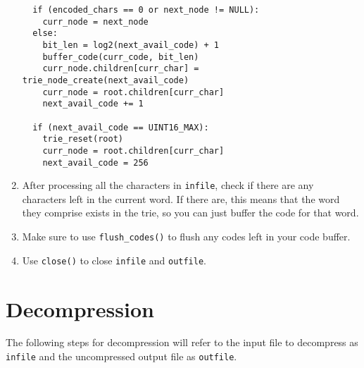 \documentclass{article}
\begin{document}
\begin{enumerate}
\begin{lstlisting}
  if (encoded_chars == 0 or next_node != NULL):
    curr_node = next_node
  else:
    bit_len = log2(next_avail_code) + 1
    buffer_code(curr_code, bit_len)
    curr_node.children[curr_char] = trie_node_create(next_avail_code)
    curr_node = root.children[curr_char]
    next_avail_code += 1

  if (next_avail_code == UINT16_MAX):
    trie_reset(root)
    curr_node = root.children[curr_char]
    next_avail_code = 256
\end{lstlisting}

    \item After processing all the characters in \texttt{infile}, check if there
        are any characters left in the current word. If there are, this means
        that the word they comprise exists in the trie, so you can just buffer
        the code for that word.
    \item Make sure to use \texttt{flush\_codes()} to flush any codes left in
        your code buffer.
    \item Use \texttt{close()} to close \texttt{infile} and \texttt{outfile}.
\end{enumerate}

\section{Decompression}
The following steps for decompression will refer to the input file to decompress
as \texttt{infile} and the uncompressed output file as \texttt{outfile}.
\end{document}
